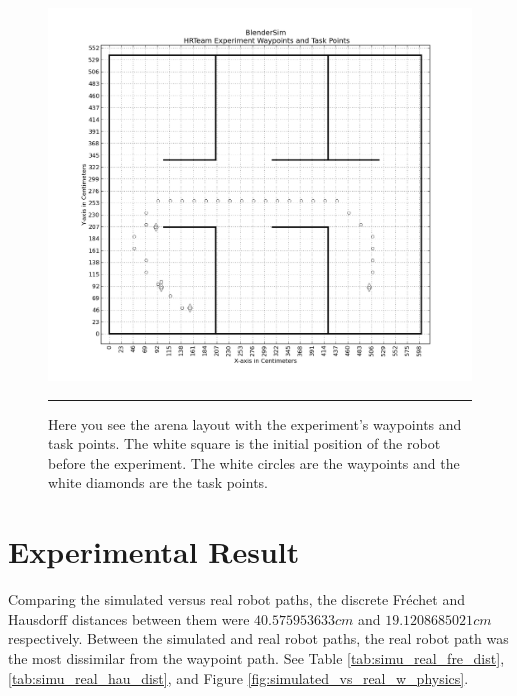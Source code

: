 \begin{figure}[htbp]
\centering
\includegraphics[width=6in]{../Figures/Chapter5/experiment_arena_layout.png}
\rule{35em}{0.5pt}
\caption[HRTeam Experiment Waypoint and Task Points]{Here you see the arena layout with the experiment's waypoints and task points. The white square is the initial position of the robot before the experiment. The white circles are the waypoints and the white diamonds are the task points.}
\label{fig:experiment_arena_layout}
\end{figure}

\newpage

\section{Experimental Result}

Comparing the simulated versus real robot paths, the discrete Fr{\'e}chet and Hausdorff distances between them were $40.575953633cm$ and $19.1208685021cm$ respectively. Between the simulated and real robot paths, the real robot path was the most dissimilar from the waypoint path. See Table \ref{tab:simu_real_fre_dist}, \ref{tab:simu_real_hau_dist}, and Figure \ref{fig:simulated_vs_real_w_physics}.

